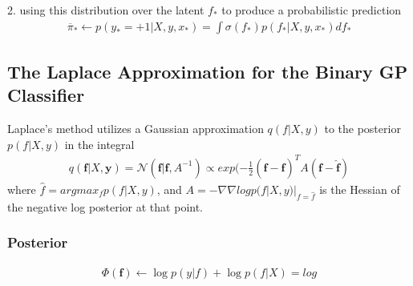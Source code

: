 \documentclass[a4paper]{article}
\begin{document}
2. using this distribution over the latent $f_*$ to produce a probabilistic prediction
\begin{align}
  \overline{\pi}_* \gets p(y_*=+1|X,y,x_*) = \int \sigma(f_*)p(f_*|X,y,x_*) df_*
\end{align}


\subsection{The Laplace Approximation for the Binary GP Classifier}
Laplace’s method utilizes a Gaussian approximation $q(f|X, y)$ to the posterior $p(f|X, y)$ in the integral
\begin{align}
  q(\mathbf{f}|X,\mathbf{y}) = \mathcal{N}(\mathbf{f}|\mathbf{\hat{f}}, A^{-1}) \propto exp(-\frac{1}{2} (\mathbf{f} - \mathbf{\hat{f}})^T A (\mathbf{f} - \mathbf{\hat{f}})
\end{align}
where $\hat{f} = argmax_f p(f|X, y)$, and $A = -\nabla\nabla log p(f|X, y)|_{f=\hat{f}}$ is the Hessian of the negative log posterior at that point.

\subsubsection{Posterior}
\label{sec:3.4.1}

\begin{align}
  \Phi(\mathbf{f}) \gets \log p(y|f) + \log p(f|X) = log
\end{align}
\end{document}
